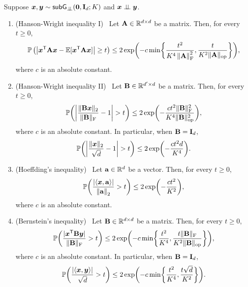 \begin{lem}[Concentration]\label{lem:subG_concentrate}
    Suppose $\text{\boldmath $x$}, \text{\boldmath $y$} \sim {\sf{subG}_{\perp\!\!\!\perp}}(\mathrm{\bf 0}, \mathrm{\bf I}_d; K)$ and $\text{\boldmath $x$} \perp\!\!\!\perp \text{\boldmath $y$}$.
    \begin{enumerate}[label=(\alph*)]
        \item \label{lem:subG-Hanson-Wright-I} (Hanson-Wright inequality I)  \  Let $\mathrm{\bf A} \in \mathbb{R}^{d \times d}$ be a matrix. Then, for every $t \ge 0$,
        \begin{equation*}
           \mathbb{P}\left( \bigl| \text{\boldmath $x$}^{\sf T} \mathrm{\bf A} \text{\boldmath $x$} - \mathbb{E}[\text{\boldmath $x$}^{\sf T} \mathrm{\bf A} \text{\boldmath $x$}] \bigr| \ge t \right)
           \le 2 \exp\biggl( -c \min \biggl\{ \frac{t^2}{K^4 \left\|{\mathrm{\bf A}}\right\|_\mathrm{F}^2} , \frac{ t }{ K^2 \| \mathrm{\bf A} \|_{\mathrm{op}} } \biggr\} \biggr),
        \end{equation*}
        where $c$ is an absolute constant.
        \item \label{lem:subG-Hanson-Wright-II} (Hanson-Wright inequality II) \  Let $\mathrm{\bf B} \in \mathbb{R}^{d' \times d}$ be a matrix. Then, for every $t \ge 0$,
        \begin{equation*}
            \mathbb{P}\biggl( \biggl| \frac{\| \mathrm{\bf B} \text{\boldmath $x$} \|_2}{ \| \mathrm{\bf B} \|_\mathrm{F}} - 1 \biggr| > t \biggr)
            \le 2 \exp\biggl( -\frac{ct^2 \| \mathrm{\bf B} \|_\mathrm{F}^2 }{K^4 \| \mathrm{\bf B} \|_{\mathrm{op}}^2 } \biggr),
        \end{equation*}
        where $c$ is an absolute constant. In particular, when $\mathrm{\bf B} = \mathrm{\bf I}_d$,
        \begin{equation*}
            \mathbb{P}\biggl( \biggl| \frac{\| \text{\boldmath $x$} \|_2}{ \sqrt{d} } - 1 \biggr| > t \biggr)
            \le 2 \exp\biggl( -\frac{ct^2 d}{K^4} \biggr).
        \end{equation*}

        \item \label{lem:subG-Hoeffding} (Hoeffding's inequality) \ Let $\mathrm{\bf a} \in \mathbb{R}^{d}$ be a vector. Then, for every $t \ge 0$,
        \begin{equation*}
            \mathbb{P}\biggl( \frac{ \left|{\langle \text{\boldmath $x$}, \mathrm{\bf a} \rangle}\right| }{ \left\|{\mathrm{\bf a}}\right\|_2 }  > t \biggr)
            \le 2 \exp\biggl( -\frac{ct^2}{K^2} \biggr),
        \end{equation*}
        where $c$ is an absolute constant.

        \item \label{lem:subG-Bernstein} (Bernstein's inequality) \ Let $\mathrm{\bf B} \in \mathbb{R}^{d \times d}$ be a matrix. Then, for every $t \ge 0$,
        \begin{equation*}
            \mathbb{P}\biggl( \frac{ | \text{\boldmath $x$}^{\sf T} \mathrm{\bf B} \text{\boldmath $y$} | }{ \| \mathrm{\bf B} \|_\mathrm{F} }  > t \biggr)
            \le 2 \exp\biggl( -c \min \biggl\{ \frac{t^2}{K^4} , \frac{ t \| \mathrm{\bf B} \|_\mathrm{F}}{ K^2 \| \mathrm{\bf B} \|_{\mathrm{op}} } \biggr\} \biggr),
        \end{equation*}
        where $c$ is an absolute constant. In particular, when $\mathrm{\bf B} = \mathrm{\bf I}_d$,
        \begin{equation*}
            \mathbb{P}\biggl( \frac{ \left|{\langle \text{\boldmath $x$}, \text{\boldmath $y$} \rangle}\right| }{ \sqrt{d} }  > t \biggr)
            \le 2 \exp\biggl( -c \min \biggl\{ \frac{t^2}{K^4} , \frac{t\sqrt{d}}{K^2} \biggr\} \biggr).
        \end{equation*}
    \end{enumerate}
\end{lem}
